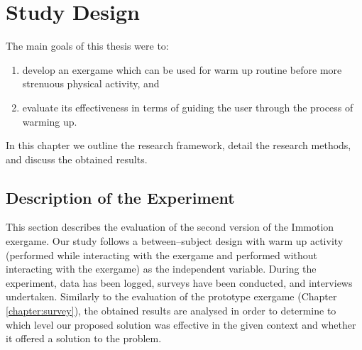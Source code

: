 \chapter{Study Design}
\label{chapter:studydesign}
The main goals of this thesis were to:
\begin{enumerate}
\item develop an exergame which can be used for warm up routine before more strenuous physical activity, and
\item evaluate its effectiveness in terms of guiding the user through the process of warming up.
\end{enumerate} In this chapter we outline the research framework, detail the research methods, and discuss the obtained results.
\section{Description of the Experiment}
This section describes the evaluation of the second version of the Immotion exergame. Our study follows a between–subject design with warm up activity (performed while
interacting with the exergame and performed without interacting with the exergame) as the independent
variable. During the experiment, data has been logged, surveys have been conducted, and interviews undertaken. Similarly to the evaluation of the prototype exergame (Chapter \ref{chapter:survey}), the obtained results are analysed in order to determine to which level our proposed solution was effective in the given context and whether it offered a solution to the problem. %

